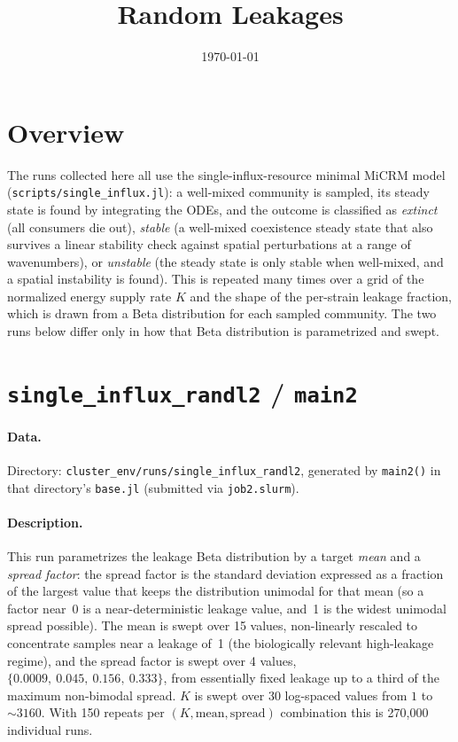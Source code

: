 \documentclass[11pt]{article}
\title{Random Leakages}
\author{}
\date{\today}
\begin{document}
\maketitle

\section*{Overview}

The runs collected here all use the single-influx-resource minimal MiCRM model
(\texttt{scripts/single\_influx.jl}): a well-mixed community is sampled, its
steady state is found by integrating the ODEs, and the outcome is classified as
\emph{extinct} (all consumers die out), \emph{stable} (a well-mixed coexistence
steady state that also survives a linear stability check against spatial
perturbations at a range of wavenumbers), or \emph{unstable} (the steady state
is only stable when well-mixed, and a spatial instability is found). This is
repeated many times over a grid of the normalized energy supply rate $K$ and
the shape of the per-strain leakage fraction, which is drawn from a Beta
distribution for each sampled community. The two runs below differ only in how
that Beta distribution is parametrized and swept.

\section{\texttt{single\_influx\_randl2} / \texttt{main2}}

\paragraph{Data.} Directory: \texttt{cluster\_env/runs/single\_influx\_randl2},
generated by \texttt{main2()} in that directory's \texttt{base.jl} (submitted
via \texttt{job2.slurm}).

\paragraph{Description.} This run parametrizes the leakage Beta distribution
by a target \emph{mean} and a \emph{spread factor}: the spread factor is the
standard deviation expressed as a fraction of the largest value that keeps the
distribution unimodal for that mean (so a factor near~0 is a near-deterministic
leakage value, and~1 is the widest unimodal spread possible). The mean is swept
over 15 values, non-linearly rescaled to concentrate samples near a leakage of~1
(the biologically relevant high-leakage regime), and the spread factor is swept
over 4 values, $\{0.0009,\ 0.045,\ 0.156,\ 0.333\}$, from essentially fixed
leakage up to a third of the maximum non-bimodal spread. $K$ is swept over 30
log-spaced values from $1$ to $\sim\!3160$. With 150 repeats per
$(K,\text{mean},\text{spread})$ combination this is 270{,}000 individual runs.
\end{document}
